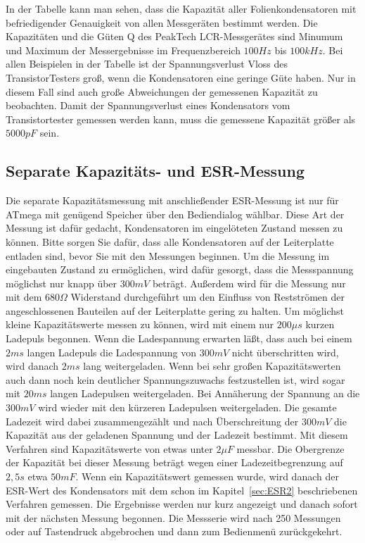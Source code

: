 In der Tabelle kann man sehen, dass die Kapazität aller Folienkondensatoren mit befriedigender Genauigkeit von allen
Messgeräten bestimmt werden. Die Kapazitäten und die Güten Q des PeakTech LCR-Messgerätes sind Minumum
und Maximum der Messergebnisse im Frequenzbereich \(100Hz\) bis \(100kHz\).
Bei allen Beispielen in der Tabelle ist der Spannungsverlust Vloss des TransistorTesters groß,
wenn die Kondensatoren eine geringe Güte haben. Nur in diesem Fall sind auch große Abweichungen
der gemessenen Kapazität zu beobachten. Damit der Spannungsverlust eines Kondensators vom
Transistortester gemessen werden kann, muss die gemessene Kapazität größer als \(5000pF\) sein.

\subsection{Separate Kapazitäts- und ESR-Messung}
Die separate Kapazitätsmessung mit anschließender ESR-Messung ist nur für ATmega mit genügend Speicher
über den Bediendialog wählbar. Diese Art der Messung ist dafür gedacht, Kondensatoren im eingelöteten
Zustand messen zu können. 
Bitte sorgen Sie dafür, dass alle Kondensatoren auf der Leiterplatte entladen sind, bevor Sie mit den
Messungen beginnen.
Um die Messung im eingebauten Zustand zu ermöglichen, wird dafür gesorgt,
dass die Messspannung möglichst nur knapp über \(300mV\) beträgt.
Außerdem wird für die Messung nur mit dem \(680\Omega\) Widerstand durchgeführt um den Einfluss von
Restströmen der angeschlossenen Bauteilen auf der Leiterplatte gering zu halten.
Um möglichst kleine Kapazitätswerte messen zu können, wird mit einem nur \(200\mu s\) kurzen Ladepuls
begonnen. Wenn die Ladespannung erwarten läßt, dass auch bei einem \(2ms\) langen Ladepuls die Ladespannung
von \(300mV\) nicht überschritten wird, wird danach \(2ms\) lang weitergeladen. Wenn bei sehr großen
Kapazitätswerten auch dann noch kein deutlicher Spannungszuwachs festzustellen ist, wird sogar mit
\(20ms\) langen Ladepulsen weitergeladen. Bei Annäherung der Spannung an die \(300mV\) wird wieder
mit den kürzeren Ladepulsen weitergeladen. Die gesamte Ladezeit wird dabei zusammengezählt und nach
Überschreitung der \(300mV\) die Kapazität aus der geladenen Spannung und der Ladezeit bestimmt.
Mit diesem Verfahren sind Kapazitätswerte von etwas unter \(2\mu F\) messbar. Die Obergrenze der Kapazität
bei dieser Messung beträgt wegen einer Ladezeitbegrenzung auf \(2,5s\) etwa \(50mF\).
Wenn ein Kapazitätswert gemessen wurde, wird danach der ESR-Wert des Kondensators mit dem schon
im Kapitel~\ref{sec:ESR2} beschriebenen Verfahren gemessen.
Die Ergebnisse werden nur kurz angezeigt und danach sofort mit der nächsten Messung begonnen.
Die Messserie wird nach 250 Messungen oder auf Tastendruck abgebrochen und dann zum Bedienmenü zurückgekehrt.

